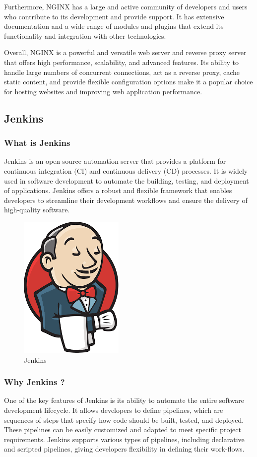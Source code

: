 \documentclass[
12pt,
oneside, 
onehalfspacing, 
nolistspacing, 
parskip, 
chapterinoneline, 
]{AASTCOMPUTER}
\begin{document}
Furthermore, NGINX has a large and active community of developers and users who contribute to its development and provide support. It has extensive documentation and a wide range of modules and plugins that extend its functionality and integration with other technologies.

Overall, NGINX is a powerful and versatile web server and reverse proxy server that offers high performance, scalability, and advanced features. Its ability to handle large numbers of concurrent connections, act as a reverse proxy, cache static content, and provide flexible configuration options make it a popular choice for hosting websites and improving web application performance.

\subsection{Jenkins}
\subsubsection{What is Jenkins}
Jenkins is an open-source automation server that provides a platform for continuous integration (CI) and continuous delivery (CD) processes. It is widely used in software development to automate the building, testing, and deployment of applications. Jenkins offers a robust and flexible framework that enables developers to streamline their development workflows and ensure the delivery of high-quality software.
\begin{figure}[!ht]
	\centering
	\includegraphics[scale=0.5]{Figures/DevOps/jenkins.png}
  	\caption{Jenkins}
  	\label{fig:Jenkins}
\end{figure}
\subsubsection{Why Jenkins ?}
One of the key features of Jenkins is its ability to automate the entire software development lifecycle. It allows developers to define pipelines, which are sequences of steps that specify how code should be built, tested, and deployed. These pipelines can be easily customized and adapted to meet specific project requirements. Jenkins supports various types of pipelines, including declarative and scripted pipelines, giving developers flexibility in defining their work-flows.
\end{document}
